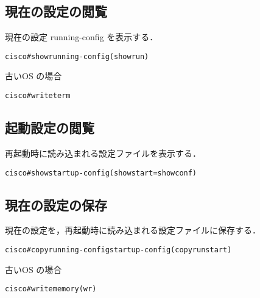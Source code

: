 \subsection*{現在の設定の閲覧}
現在の設定 running-config を表示する．

\begin{center}
\begin{screen}
\begin{alltt}
cisco#show running-config   (show run)
\end{alltt}
\end{screen}
\end{center}

古いOS の場合

\begin{center}
\begin{screen}
\begin{alltt}
cisco#write term
\end{alltt}
\end{screen}
\end{center}


\subsection*{起動設定の閲覧}
再起動時に読み込まれる設定ファイルを表示する．

\begin{center}
\begin{screen}
\begin{alltt}
cisco#show startup-config   (show start = show conf)
\end{alltt}
\end{screen}
\end{center}

\subsection*{現在の設定の保存}
現在の設定を，再起動時に読み込まれる設定ファイルに保存する．

\begin{center}
\begin{screen}
\begin{alltt}
cisco#copy running-config startup-config    (copy run start)
\end{alltt}
\end{screen}
\end{center}

古いOS の場合

\begin{center}
\begin{screen}
\begin{alltt}
cisco#write memory    (wr)
\end{alltt}
\end{screen}
\end{center}


